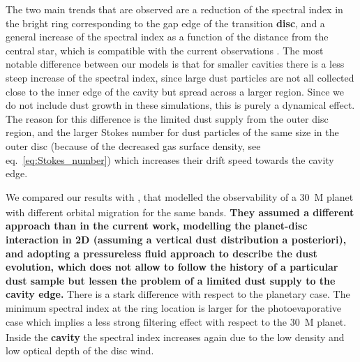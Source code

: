 \documentclass[fleqn,usenatbib]{mnras}
\begin{document}
    The two main trends that are observed are a reduction of the spectral index in the bright ring corresponding to the gap edge of the transition \textbf{disc}, and a general increase of the spectral index as a function of the distance from the central star, which is compatible with the current observations \citep[e.g.][]{Long2020}.
    The most notable difference between our models is that for smaller cavities there is a less steep increase of the spectral index, since large dust particles are not all collected close to the inner edge of the cavity but spread across a larger region.
    Since we do not include dust growth in these simulations, this is purely a dynamical effect. The reason for this difference is the limited dust supply from the outer disc region, and the larger Stokes number for dust particles of the same size in the outer disc (because of the decreased gas surface density, see eq.~\ref{eq:Stokes_number}) which increases their drift speed towards the cavity edge.

    We compared our results with \citet{Nazari_2019}, that modelled the observability of a \SI{30}{M_\oplus} planet with different orbital migration for the same bands.
    \textbf{They assumed a different approach than in the current work, modelling the planet-disc interaction in 2D (assuming a vertical dust distribution a posteriori), and adopting a pressureless fluid approach to describe the dust evolution, which does not allow to follow the history of a particular dust sample but lessen the problem of a limited dust supply to the cavity edge.} 
    There is a stark difference with respect to the planetary case. 
    The minimum spectral index at the ring location is larger for the photoevaporative case which implies a less strong filtering effect with respect to the \SI{30}{M_\oplus} planet. 
    Inside the \textbf{cavity} the spectral index increases again due to the low density and low optical depth of the disc wind.%
\end{document}
